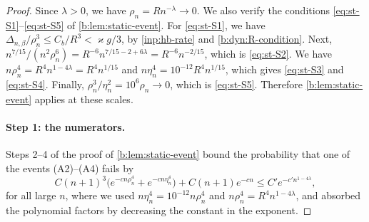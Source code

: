 \begin{proof}
Since $\lambda>0$, we have $\rho_n=Rn^{-\lambda}\to0$. We also verify the conditions \eqref{eq:st-S1}--\eqref{eq:st-S5} of \cref{b:lem:static-event}. For \eqref{eq:st-S1}, we have $\Delta_{n,\beta}/\rho_n^3\le C_b/R^3<\varkappa g/3$, by \cref{inp:hb-rate} and \eqref{b:dyn:R-condition}. Next, $n^{7/15}/(n^2\rho_n^6)=R^{-6}n^{7/15-2+6\lambda}=R^{-6}n^{-2/15}$, which is \eqref{eq:st-S2}. We have $n\rho_n^4=R^4n^{1-4\lambda}=R^4n^{1/15}$ and $n\eta_n^4=10^{-12}R^4n^{1/15}$, which gives \eqref{eq:st-S3} and \eqref{eq:st-S4}. Finally, $\rho_n^3/\eta_n^2=10^6\rho_n\to0$, which is \eqref{eq:st-S5}. Therefore \cref{b:lem:static-event} applies at these scales.

\paragraph{Step 1: the numerators.} Steps 2--4 of the proof of \cref{b:lem:static-event} bound the probability that one of the events (A2)--(A4) fails by
\[
 C(n+1)^3\bigl(e^{-cn\rho_n^4}+e^{-cn\eta_n^4}\bigr)+C(n+1)e^{-cn}\le C'e^{-c'n^{1-4\lambda}},
\]
for all large $n$, where we used $n\eta_n^4=10^{-12}n\rho_n^4$ and $n\rho_n^4=R^4n^{1-4\lambda}$, and absorbed the polynomial factors by decreasing the constant in the exponent.


\end{proof}
